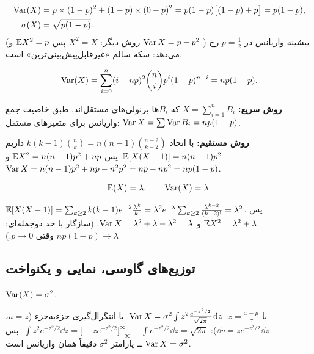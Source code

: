 \begin{example}
\[
\begin{aligned}
\operatorname{Var}(X)&=p\times(1-p)^2+(1-p)\times(0-p)^2=p(1-p)\big[(1-p)+p\big]=p(1-p),\\
\sigma(X)&=\sqrt{p(1-p)} .
\end{aligned}
\]
(روش دیگر: $X^2=X$ پس $\mathbb{E} X^2=p$ و $\operatorname{Var} X=p-p^2$.) بیشینه واریانس در $p=\frac12$ رخ می‌دهد: سکه سالم «غیرقابل‌پیش‌بینی‌ترین» است.
\end{example}

\begin{example}
\[
\operatorname{Var}(X)=\sum_{i=0}^{n}(i-np)^2\binom nip^i(1-p)^{n-i}=np(1-p).
\]
\begin{solution}
\textbf{روش سریع:} $X=\sum_{i=1}^nB_i$ که $B_i$ها برنولی‌های مستقل‌اند. طبق خاصیت جمع واریانس برای متغیرهای مستقل: $\operatorname{Var} X=\sum\operatorname{Var} B_i=np(1-p)$.

\textbf{روش مستقیم:} با اتحاد $k(k-1)\binom nk=n(n-1)\binom{n-2}{k-2}$ داریم $\mathbb{E}[X(X-1)]=n(n-1)p^2$. پس
$\mathbb{E} X^2=n(n-1)p^2+np$ و $\operatorname{Var} X=n(n-1)p^2+np-n^2p^2=np-np^2=np(1-p)$.
\end{solution}
\end{example}

\begin{example}
\[
\mathbb{E}(X)=\lambda,\qquad \operatorname{Var}(X)=\lambda .
\]
\begin{solution}
$\mathbb{E}[X(X-1)]=\sum_{k\ge2}k(k-1)e^{-\lambda}\frac{\lambda^k}{k!}=\lambda^2e^{-\lambda}\sum_{k\ge2}\frac{\lambda^{k-2}}{(k-2)!}=\lambda^2$. پس $\mathbb{E} X^2=\lambda^2+\lambda$ و $\operatorname{Var} X=\lambda^2+\lambda-\lambda^2=\lambda$. (سازگار با حد دوجمله‌ای: $np(1-p)\to\lambda$ وقتی $p\to0$.)
\end{solution}
\end{example}

\subsection{توزیع‌های گاوسی، نمایی و یکنواخت}

\begin{example}
$\operatorname{Var}(X)=\sigma^2$.
\begin{solution}
با $z=\frac{x-\mu}{\sigma}$: $\operatorname{Var} X=\sigma^2\int z^2\frac{e^{-z^2/2}}{\sqrt{2\pi}}\,\mathrm{d} z$. با انتگرال‌گیری جزءبه‌جزء ($u=z$، $\dd v=ze^{-z^2/2}\dd z$):
$\int z^2e^{-z^2/2}\dd z=\big[-ze^{-z^2/2}\big]_{-\infty}^{\infty}+\int e^{-z^2/2}\dd z=\sqrt{2\pi}$. پس $\operatorname{Var} X=\sigma^2$ ــ پارامتر $\sigma^2$ دقیقاً همان واریانس است.
\end{solution}
\end{example}


